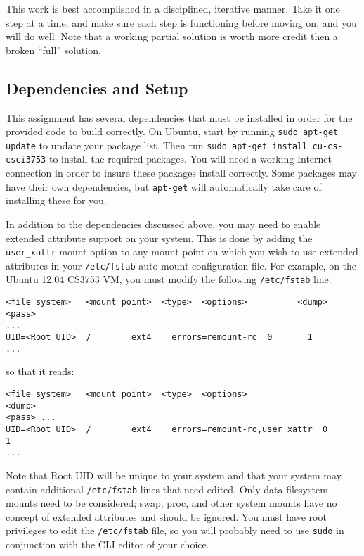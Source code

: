 \documentclass[12pt]{article}
\begin{document}
This work is best accomplished in a disciplined, iterative manner. Take
it one step at a time, and make sure each step is functioning before
moving on, and you will do well. Note that a working partial solution
is worth more credit then a broken ``full'' solution.

\subsection{Dependencies and Setup}
This assignment has several dependencies that must be installed in order
for the provided code to build correctly. On Ubuntu, start
by running \texttt{sudo apt-get update} to update your package
list. Then run \texttt{sudo apt-get install cu-cs-csci3753} to install the
required packages.  You will need a working Internet connection in order to
insure these packages install correctly.  Some packages may have their own
dependencies, but \texttt{apt-get} will automatically take care of installing 
these for you.

In addition to the dependencies discussed above, you may need to
enable extended attribute support on your system. This is done by
adding the \texttt{user\_xattr} mount option to any mount point on
which you wish to use extended attributes in your \texttt{/etc/fstab}
auto-mount configuration file. For example, on the Ubuntu 12.04 CS3753
VM, you must modify the following \texttt{/etc/fstab} line:

\begin{verbatim}
<file system>   <mount point>  <type>  <options>          <dump>  <pass> 
...
UID=<Root UID>  /        ext4    errors=remount-ro  0       1
...
\end{verbatim}

so that it reads:

\begin{verbatim}
<file system>   <mount point>  <type>  <options>                     <dump> 
<pass> ...
UID=<Root UID>  /        ext4    errors=remount-ro,user_xattr  0       1
...
\end{verbatim}

Note that Root UID will be unique to your system and that your
system may contain additional \texttt{/etc/fstab} lines that need
edited. Only data filesystem mounts need to be considered; swap, proc, and
other system mounts have no concept of extended attributes and should
be ignored. You must have root privileges to edit the
\texttt{/etc/fstab} file, so you will probably need to use
\texttt{sudo} in conjunction with the CLI editor of your choice.
\end{document}
